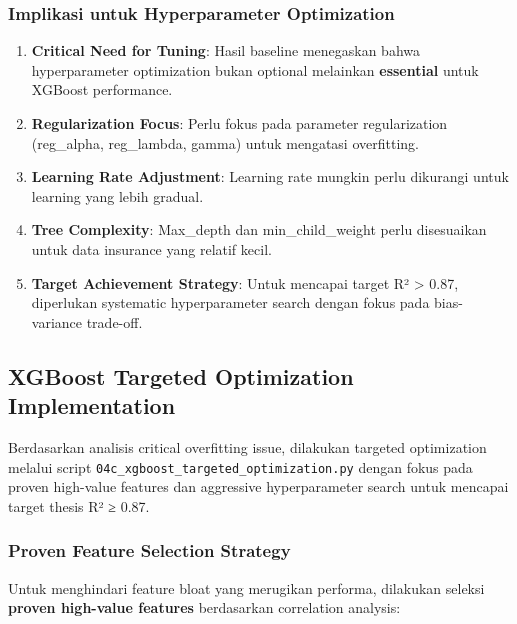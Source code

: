 \subsubsection{Implikasi untuk Hyperparameter Optimization}
\begin{enumerate}
    \item \textbf{Critical Need for Tuning}: Hasil baseline menegaskan bahwa hyperparameter optimization bukan optional melainkan \textbf{essential} untuk XGBoost performance.

    \item \textbf{Regularization Focus}: Perlu fokus pada parameter regularization (reg\_alpha, reg\_lambda, gamma) untuk mengatasi overfitting.

    \item \textbf{Learning Rate Adjustment}: Learning rate mungkin perlu dikurangi untuk learning yang lebih gradual.

    \item \textbf{Tree Complexity}: Max\_depth dan min\_child\_weight perlu disesuaikan untuk data insurance yang relatif kecil.

    \item \textbf{Target Achievement Strategy}: Untuk mencapai target R² > 0.87, diperlukan systematic hyperparameter search dengan fokus pada bias-variance trade-off.
\end{enumerate}

\subsection{XGBoost Targeted Optimization Implementation}
\label{subsec:xgboost-targeted}

Berdasarkan analisis critical overfitting issue, dilakukan targeted optimization melalui script \texttt{04c\_xgboost\_targeted\_optimization.py} dengan fokus pada proven high-value features dan aggressive hyperparameter search untuk mencapai target thesis R² ≥ 0.87.

\subsubsection{Proven Feature Selection Strategy}
Untuk menghindari feature bloat yang merugikan performa, dilakukan seleksi \textbf{proven high-value features} berdasarkan correlation analysis:

